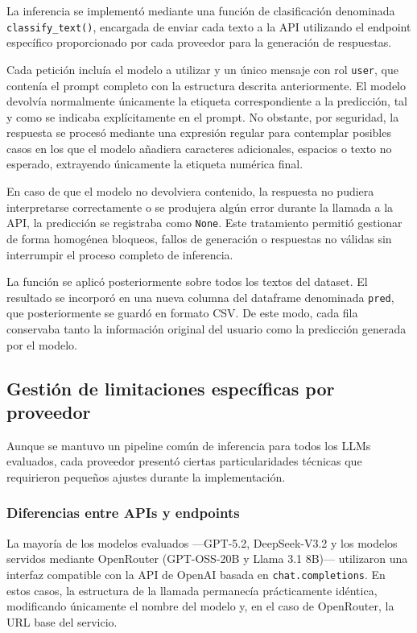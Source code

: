La inferencia se implementó mediante una función de clasificación denominada \texttt{classify\_text()}, encargada de enviar cada texto a la API utilizando el endpoint específico proporcionado por cada proveedor para la generación de respuestas.

Cada petición incluía el modelo a utilizar y un único mensaje con rol \texttt{user}, que contenía el prompt completo con la estructura descrita anteriormente. El modelo devolvía normalmente únicamente la etiqueta correspondiente a la predicción, tal y como se indicaba explícitamente en el prompt. No obstante, por seguridad, la respuesta se procesó mediante una expresión regular para contemplar posibles casos en los que el modelo añadiera caracteres adicionales, espacios o texto no esperado, extrayendo únicamente la etiqueta numérica final.

En caso de que el modelo no devolviera contenido, la respuesta no pudiera interpretarse correctamente o se produjera algún error durante la llamada a la API, la predicción se registraba como \texttt{None}. Este tratamiento permitió gestionar de forma homogénea bloqueos, fallos de generación o respuestas no válidas sin interrumpir el proceso completo de inferencia.

La función se aplicó posteriormente sobre todos los textos del dataset. El resultado se incorporó en una nueva columna del dataframe denominada \texttt{pred}, que posteriormente se guardó en formato CSV. De este modo, cada fila conservaba tanto la información original del usuario como la predicción generada por el modelo.

\subsection{Gestión de limitaciones específicas por proveedor}

Aunque se mantuvo un pipeline común de inferencia para todos los \acp{LLM} evaluados, cada proveedor presentó ciertas particularidades técnicas que requirieron pequeños ajustes durante la implementación.

\subsubsection{Diferencias entre APIs y endpoints}

La mayoría de los modelos evaluados —GPT-5.2, DeepSeek-V3.2 y los modelos servidos mediante OpenRouter (GPT-OSS-20B y Llama 3.1 8B)— utilizaron una interfaz compatible con la API de OpenAI basada en \texttt{chat.completions}. En estos casos, la estructura de la llamada permanecía prácticamente idéntica, modificando únicamente el nombre del modelo y, en el caso de OpenRouter, la URL base del servicio.

